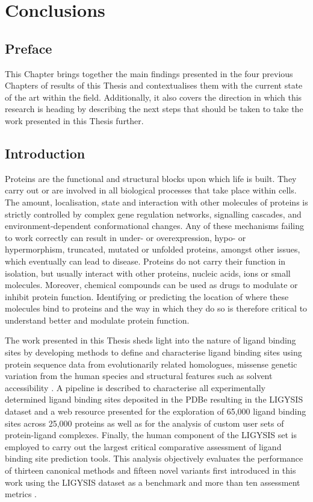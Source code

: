 \chapter{Conclusions}

\section*{Preface}

This Chapter brings together the main findings presented in the four previous Chapters of results of this Thesis and contextualises them with the current state of the art within the field. Additionally, it also covers the direction in which this research is heading by describing the next steps that should be taken to take the work presented in this Thesis further.

\section{Introduction}

Proteins are the functional and structural blocks upon which life is built. They carry out or are involved in all biological processes that take place within cells. The amount, localisation, state and interaction with other molecules of proteins is strictly controlled by complex gene regulation networks, signalling cascades, and environment-dependent conformational changes. Any of these mechanisms failing to work correctly can result in under- or overexpression, hypo- or hypermorphism, truncated, mutated or unfolded proteins, amongst other issues, which eventually can lead to disease. Proteins do not carry their function in isolation, but usually interact with other proteins, nucleic acids, ions or small molecules. Moreover, chemical compounds can be used as drugs to modulate or inhibit protein function. Identifying or predicting the location of where these molecules bind to proteins and the way in which they do so is therefore critical to understand better and modulate protein function.

The work presented in this Thesis sheds light into the nature of ligand binding sites by developing methods to define and characterise ligand binding sites using protein sequence data from evolutionarily related homologues, missense genetic variation from the human species and structural features such as solvent accessibility \cite{UTGES_2024_FRAGSYS}. A pipeline is described to characterise all experimentally determined ligand binding sites deposited in the PDBe \cite{ARMSTRONG_2020_PDBE} resulting in the LIGYSIS dataset and a web resource presented for the exploration of 65,000 ligand binding sites across 25,000 proteins as well as for the analysis of custom user sets of protein-ligand complexes. Finally, the human component of the LIGYSIS set is employed to carry out the largest critical comparative assessment of ligand binding site prediction tools. This analysis objectively evaluates the performance of thirteen canonical methods and fifteen novel variants first introduced in this work using the LIGYSIS dataset as a benchmark and more than ten assessment metrics \cite{UTGES_2024_LBSCOMP}.

